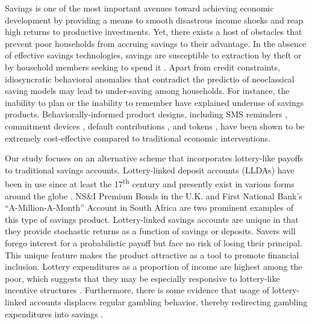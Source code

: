 \documentclass[10pt]{article}
\begin{document}
	Savings is one of the most important avenues toward achieving economic development by providing a means to smooth disastrous income shocks and reap high returns to productive investments. Yet, there exists a host of obstacles that prevent poor households from accruing savings to their advantage. In the absence of effective savings technologies, savings are susceptible to extraction by theft or by household members seeking to spend it . Apart from credit constraints, idiosyncratic behavioral anomalies that contradict the predictio of neoclassical saving models may lead to under-saving among households. For instance, the inability to plan or the inability to remember have explained underuse of savings products. Behaviorally-informed product designs, including SMS reminders , commitment devices , default contributions , and tokens , have been shown to be extremely cost-effective compared to traditional economic interventions.

	Our study focuses on an alternative scheme that incorporates lottery-like payoffs to traditional savings accounts. Lottery-linked deposit accounts (LLDAs) have been in use since at least the 17\textsuperscript{th} century and presently exist in various forms around the globe . NS\&I Premium Bonds in the U.K. and First National Bank's ``A-Million-A-Month'' Account in South Africa are two prominent examples of this type of savings product. Lottery-linked savings accounts are unique in that they provide stochastic returns as a function of savings or deposits. Savers will forego interest for a probabilistic payoff but face no risk of losing their principal. This unique feature makes the product attractive as a tool to promote financial inclusion. Lottery expenditures as a proportion of income are highest among the poor, which suggests that they may be especially responsive to lottery-like incentive structures . Furthermore, there is some evidence that usage of lottery-linked accounts displaces regular gambling behavior, thereby redirecting gambling expenditures into savings .

\end{document}
